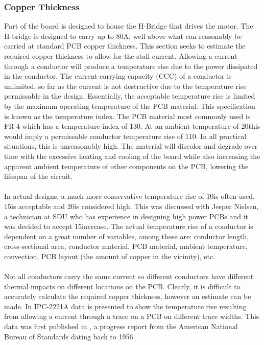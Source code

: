 \subsubsection{Copper Thickness}
Part of the board is designed to house the H-Bridge that drives the motor.
The H-bridge is designed to carry up to 80A, well above what can reasonably be carried at standard PCB copper thickness.
This section seeks to estimate the required copper thickness to allow for the stall current.
Allowing a current through a conductor will produce a temperature rise due to the power dissipated in the conductor.
The current-carrying capacity (CCC) of a conductor is unlimited, so far as the current is not destructive due to the temperature rise permissable in the design.
Essentially, the acceptable temperature rise is limited by the maximum operating temperature of the PCB material.
This specification is known as the temperature index.
The PCB material most commonly used is FR-4 which has a temperature index of 130\degree \cite{fr4}.
At an ambient temperature of 20\degree this would imply a permissable conductor temperature rise of 110\degree.
In all practical situations, this is unreasonably high.
The material will discolor and degrade over time with the excessive heating and cooling of the board while also increasing the apparent ambient temperature of other components on the PCB, lowering the lifespan of the circuit.
\\~\\
In actual designs, a much more conservative temperature rise of 10\degree is often used, 15\degree is acceptable and 20\degree is considered high.
This was discussed with Jesper Nielsen, a technician at SDU who has experience in designing high power PCBs and it was decided to accept 15\degree increase. 
The actual temperature rise of a conductor is dependent on a great number of variables, among these are: conductor length, cross-sectional area, conductor material, PCB material, ambient temperature, convection, PCB layout (the amount of copper in the vicinity), etc.
\\~\\
Not all conductors carry the same current so different conductors have different thermal impacts on different locations on the PCB.
Clearly, it is difficult to accurately calculate the required copper thickness, however an estimate can be made.
In IPC-2221A \cite{ipc2221} data is presented to show the temperature rise resulting from allowing a current through a trace on a PCB on different trace widths.
This data was first published in \cite{conduct}, a progress report from the American National Bureau of Standards dating back to 1956.
